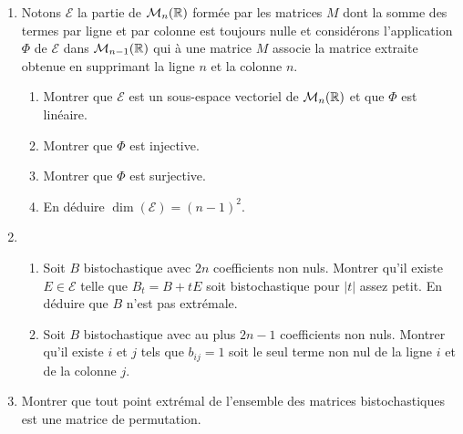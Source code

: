 \begin{enumerate}
 \item Notons $\mathcal{E}$ la partie de $\mathcal{M}_n(\mathbb{R})$ formée par les matrices $M$ dont la somme des termes par ligne et par colonne est toujours nulle et considérons l'application $\Phi$ de $\mathcal{E}$ dans $\mathcal{M}_{n-1}(\mathbb{R})$ qui à une matrice $M$ associe la matrice extraite obtenue en supprimant la ligne $n$ et la colonne $n$. 
 \begin{enumerate}
  \item Montrer que $\mathcal{E}$ est un sous-espace vectoriel de $\mathcal{M}_n(\mathbb{R})$ et que $\Phi$ est linéaire.
  \item Montrer que $\Phi$ est injective.
  \item Montrer que $\Phi$ est surjective.
  \item En déduire $\dim ( \mathcal{E} ) = (n-1)^2$.
 \end{enumerate}

 \item 
 \begin{enumerate}
  \item Soit $B$ bistochastique avec $2n$ coefficients non nuls. Montrer qu'il existe $E\in \mathcal{E}$ telle que $B_t = B + t E$ soit bistochastique pour $|t|$ assez petit. En déduire que $B$ n'est pas extrémale.
  \item Soit $B$ bistochastique avec au plus $2n-1$ coefficients non nuls. Montrer qu'il existe $i$ et $j$ tels que $b_{i j} = 1$ soit le seul terme non nul de la ligne $i$ et de la colonne $j$.
 \end{enumerate}

 \item Montrer que tout point extrémal de l'ensemble des matrices bistochastiques est une matrice de permutation.
\end{enumerate}


